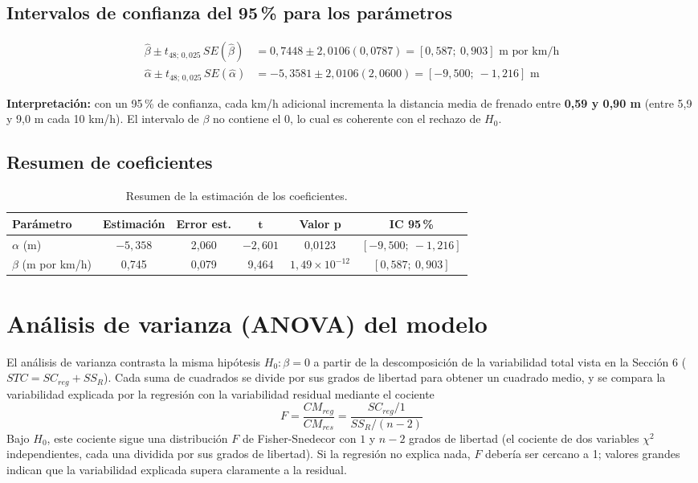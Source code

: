 \documentclass[12pt,a4paper]{article}
\begin{document}
\subsection{Intervalos de confianza del 95\,\% para los parámetros}

\begin{align}
\hat{\beta} \pm t_{48;\,0{,}025}\,SE(\hat{\beta}) &= 0{,}7448 \pm 2{,}0106(0{,}0787) = [0{,}587;\ 0{,}903] \text{ m por km/h} \\
\hat{\alpha} \pm t_{48;\,0{,}025}\,SE(\hat{\alpha}) &= -5{,}3581 \pm 2{,}0106(2{,}0600) = [-9{,}500;\ -1{,}216] \text{ m}
\end{align}

\textbf{Interpretación:} con un 95\,\% de confianza, cada km/h adicional incrementa la distancia media de frenado entre \textbf{0{,}59 y 0{,}90 m} (entre 5{,}9 y 9{,}0 m cada 10 km/h). El intervalo de $\beta$ no contiene el 0, lo cual es coherente con el rechazo de $H_0$.

\subsection{Resumen de coeficientes}

\begin{table}[H]
\centering
\caption{Resumen de la estimación de los coeficientes.}
\begin{tabular}{lccccc}
\toprule
\textbf{Parámetro} & \textbf{Estimación} & \textbf{Error est.} & $\boldsymbol{t}$ & \textbf{Valor p} & \textbf{IC 95\,\%} \\
\midrule
$\alpha$ (m) & $-5{,}358$ & 2{,}060 & $-2{,}601$ & 0{,}0123 & $[-9{,}500;\ -1{,}216]$ \\
$\beta$ (m por km/h) & 0{,}745 & 0{,}079 & 9{,}464 & $1{,}49 \times 10^{-12}$ & $[0{,}587;\ 0{,}903]$ \\
\bottomrule
\end{tabular}
\end{table}

\section{Análisis de varianza (ANOVA) del modelo}

El análisis de varianza contrasta la misma hipótesis $H_0: \beta = 0$ a partir de la descomposición de la variabilidad total vista en la Sección 6 ($STC = SC_{reg} + SS_R$). Cada suma de cuadrados se divide por sus grados de libertad para obtener un cuadrado medio, y se compara la variabilidad explicada por la regresión con la variabilidad residual mediante el cociente
\begin{equation}
	F = \frac{CM_{reg}}{CM_{res}} = \frac{SC_{reg}/1}{SS_R/(n-2)}
\end{equation}
Bajo $H_0$, este cociente sigue una distribución $F$ de Fisher-Snedecor con $1$ y $n-2$ grados de libertad (el cociente de dos variables $\chi^2$ independientes, cada una dividida por sus grados de libertad). Si la regresión no explica nada, $F$ debería ser cercano a 1; valores grandes indican que la variabilidad explicada supera claramente a la residual.
\end{document}
